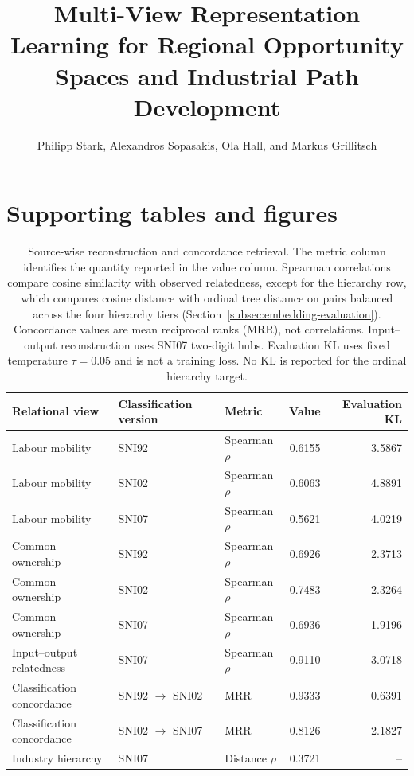 \documentclass[9pt,twoside]{pnas-new}
\begin{document}
\title{Multi-View Representation Learning for Regional Opportunity Spaces and Industrial Path Development}
\author{Philipp Stark, Alexandros Sopasakis, Ola Hall, and Markus Grillitsch}
\correspondingauthor{}
\maketitle

\section{Supporting tables and figures}
\label{sec:supporting-results}

\begin{table}[H]
\centering
\caption{Source-wise reconstruction and concordance retrieval. The metric column identifies the quantity reported in the value column. Spearman correlations compare cosine similarity with observed relatedness, except for the hierarchy row, which compares cosine distance with ordinal tree distance on pairs balanced across the four hierarchy tiers (Section~\ref{subsec:embedding-evaluation}). Concordance values are mean reciprocal ranks (MRR), not correlations. Input--output reconstruction uses SNI07 two-digit hubs. Evaluation KL uses fixed temperature $\tau=0.05$ and is not a training loss. No KL is reported for the ordinal hierarchy target.}
\label{tab:source-period-metrics}
\begin{tabular}{lllrr}
\toprule
Relational view & Classification version & Metric & Value & Evaluation KL \\
\midrule
Labour mobility & SNI92 & Spearman $\rho$ & 0.6155 & 3.5867 \\
Labour mobility & SNI02 & Spearman $\rho$ & 0.6063 & 4.8891 \\
Labour mobility & SNI07 & Spearman $\rho$ & 0.5621 & 4.0219 \\
Common ownership & SNI92 & Spearman $\rho$ & 0.6926 & 2.3713 \\
Common ownership & SNI02 & Spearman $\rho$ & 0.7483 & 2.3264 \\
Common ownership & SNI07 & Spearman $\rho$ & 0.6936 & 1.9196 \\
Input--output relatedness & SNI07 & Spearman $\rho$ & 0.9110 & 3.0718 \\
Classification concordance & SNI92 $\rightarrow$ SNI02 & MRR & 0.9333 & 0.6391 \\
Classification concordance & SNI02 $\rightarrow$ SNI07 & MRR & 0.8126 & 2.1827 \\
Industry hierarchy & SNI07 & Distance $\rho$ & 0.3721 & -- \\
\bottomrule
\end{tabular}
\end{table}
\end{document}

